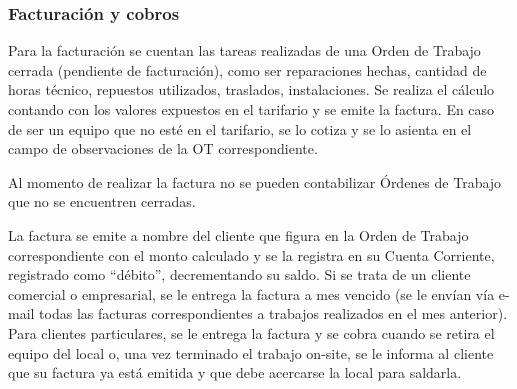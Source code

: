 \documentclass[12pt]{extarticle}
\begin{document}
\begin{spacing}{1.2}




    \subsubsection{Facturación y cobros}
    Para la facturación se cuentan las tareas realizadas de una Orden de Trabajo cerrada (pendiente de facturación), como ser reparaciones hechas, cantidad de horas técnico, repuestos utilizados, traslados, instalaciones. Se realiza el cálculo contando con los valores expuestos en el tarifario y se emite la factura. En caso de ser un equipo que no esté en el tarifario, se lo cotiza y se lo asienta en el campo de observaciones de la OT correspondiente.

    Al momento de realizar la factura no se pueden contabilizar Órdenes de Trabajo que no se encuentren cerradas.

    La factura se emite a nombre del cliente que figura en la Orden de Trabajo correspondiente con el monto calculado y se la registra en su Cuenta Corriente, registrado como ``débito'', decrementando su saldo. Si se trata de un cliente comercial o empresarial, se le entrega la factura a mes vencido (se le envían vía e-mail todas las facturas correspondientes a trabajos realizados en el mes anterior). Para clientes particulares, se le entrega la factura y se cobra cuando se retira el equipo del local o, una vez terminado el trabajo on-site, se le informa al cliente que su factura ya está emitida y que debe acercarse la local para saldarla.


\end{spacing}
\end{document}
